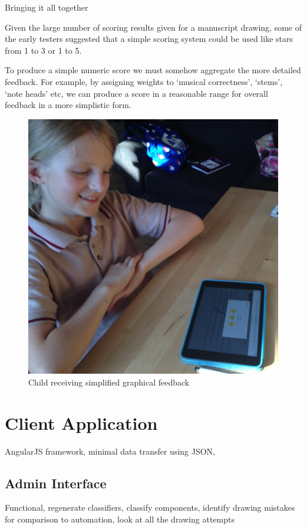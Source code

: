 Bringing it all together

Given the large number of scoring results given for a manuscript drawing, some of the early testers suggested that a simple scoring system could be used like stars from 1 to 3 or 1 to 5.

To produce a simple numeric score we must somehow aggregate the more detailed feedback. For example, by assigning weights to `musical correctness', `stems', `note heads' etc, we can produce a score in a reasonable range for overall feedback in a more simplistic form.

\begin{figure}[H]
  \includegraphics[width=\linewidth]{gfx/photos/user-receiving-feedback.jpg}
  \caption{Child receiving simplified graphical feedback}
\end{figure}
\clearpage

\section{Client Application}

AngularJS framework, minimal data transfer using JSON, 

\subsection{Admin Interface}
Functional, regenerate classifiers, classify components, identify drawing mistakes for comparison to automation, look at all the drawing attempts

